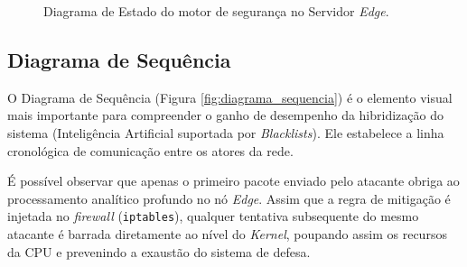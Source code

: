 \begin{figure}[H]
    \centering
    \caption{Diagrama de Estado do motor de segurança no Servidor \textit{Edge}.}
    \label{fig:diagrama_estado}
\end{figure}

\subsection{Diagrama de Sequência}
\label{sec:es_sequencia}

O Diagrama de Sequência (Figura \ref{fig:diagrama_sequencia}) é o elemento visual mais importante para compreender o ganho de desempenho da hibridização do sistema (Inteligência Artificial suportada por \textit{Blacklists}). Ele estabelece a linha cronológica de comunicação entre os atores da rede.

É possível observar que apenas o primeiro pacote enviado pelo atacante obriga ao processamento analítico profundo no nó \textit{Edge}. Assim que a regra de mitigação é injetada no \textit{firewall} (\texttt{iptables}), qualquer tentativa subsequente do mesmo atacante é barrada diretamente ao nível do \textit{Kernel}, poupando assim os recursos da CPU e prevenindo a exaustão do sistema de defesa.

